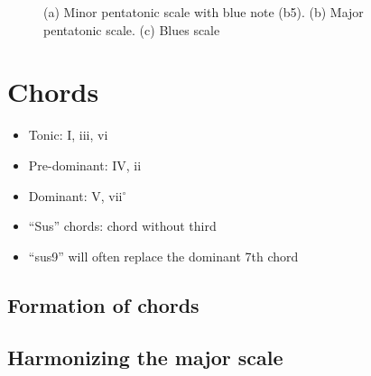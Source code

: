\documentclass{article}
\begin{document}
\begin{figure}[h!]
	\centering
	\hspace*{-1cm}
	\scalebox{0.7}{}
	\hspace*{-1cm}
	\scalebox{0.7}{}
	\hspace*{-1cm}
	\scalebox{0.7}{}
	\caption{(a) Minor pentatonic scale with blue note (b5). (b) Major pentatonic scale. (c) Blues scale  }
	\label{fig:blues_penta_mineur}
\end{figure}

\newpage
\section{Chords}

\begin{itemize}
	\item Tonic: I, iii, vi
	\item Pre-dominant: IV, ii
	\item Dominant: V, vii$^\circ$
\end{itemize}


\begin{itemize}
	\item ``Sus'' chords: chord without third
	\item ``sus9'' will often replace the dominant 7th chord
\end{itemize}

\newpage
\subsection{Formation of chords}



\newpage
\subsection{Harmonizing the major scale}



\end{document}
